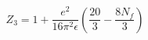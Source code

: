 \begin{equation}
Z_{3}=1+\frac{e^{2}}{16\pi^{2}\epsilon}\left(\frac{20}{3}-\frac{8N_{f}}{3}\right)
\end{equation}

